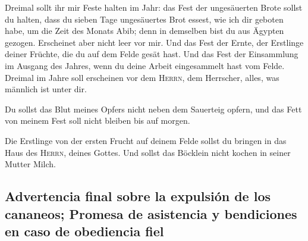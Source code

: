  Dreimal sollt ihr mir Feste halten im Jahr:
 das Fest der ungesäuerten Brote sollst du halten, dass
du sieben Tage ungesäuertes Brot essest, wie ich dir geboten habe, um
die Zeit des Monats Abib; denn in demselben bist du aus Ägypten gezogen.
Erscheinet aber nicht leer vor mir.  Und das Fest der
Ernte, der Erstlinge deiner Früchte, die du auf dem Felde gesät hast.
Und das Fest der Einsammlung im Ausgang des Jahres, wenn du deine Arbeit
eingesammelt hast vom Felde.  Dreimal im Jahre soll
erscheinen vor dem \textsc{Herrn}, dem Herrscher, alles, was männlich
ist unter dir.

 Du sollst das Blut meines Opfers nicht neben dem
Sauerteig opfern, und das Fett von meinem Fest soll nicht bleiben bis
auf morgen.

 Die Erstlinge von der ersten Frucht auf deinem Felde
sollst du bringen in das Haus des \textsc{Herrn}, deines Gottes. Und
sollst das Böcklein nicht kochen in seiner Mutter Milch.

\hypertarget{advertencia-final-sobre-la-expulsiuxf3n-de-los-cananeos-promesa-de-asistencia-y-bendiciones-en-caso-de-obediencia-fiel}{%
\subsection{Advertencia final sobre la expulsión de los cananeos;
Promesa de asistencia y bendiciones en caso de obediencia
fiel}\label{advertencia-final-sobre-la-expulsiuxf3n-de-los-cananeos-promesa-de-asistencia-y-bendiciones-en-caso-de-obediencia-fiel}}


